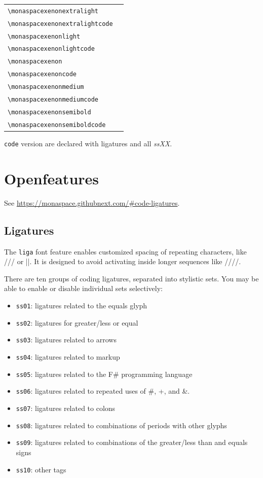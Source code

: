 \documentclass[a4paper]{scrartcl}
\newcommand*{\opt}[1]{\texttt{#1}}
\newcommand*{\cmd}[1]{\texttt{\textbackslash #1}}\newcommand*{\showtchar}[1]{\cmd{#1}~\csname #1\endcsname}
\newcommand\samplettxt{oO08 iIlL1 g9qCGQ <=>}
\newcommand\samplett[1][]{\cmd{#1} & \fbox{\csname#1\endcsname\samplettxt} \\}
\begin{document}
\begin{tabular}{ll}
	\samplett[monaspacexenonextralight]
	\samplett[monaspacexenonextralightcode]
	\samplett[monaspacexenonlight]
	\samplett[monaspacexenonlightcode]
	\samplett[monaspacexenon]
	\samplett[monaspacexenoncode]
	\samplett[monaspacexenonmedium]
	\samplett[monaspacexenonmediumcode]
	\samplett[monaspacexenonsemibold]
	\samplett[monaspacexenonsemiboldcode]
\end{tabular}

\opt{code} version are declared with ligatures and all \textit{ssXX}.

\pagebreak

\section{Openfeatures}

See \url{https://monaspace.githubnext.com/\#code-ligatures}.

\subsection{Ligatures}

The \opt{liga} font feature enables customized spacing of repeating characters, like /// or ||. It is designed to avoid activating inside longer sequences like ////.

There are ten groups of coding ligatures, separated into stylistic sets. You may be able to enable or disable individual sets selectively:

\begin{itemize}
	\item \opt{ss01}: ligatures related to the equals glyph
	\item \opt{ss02}: ligatures for greater/less or equal
	\item \opt{ss03}: ligatures related to arrows
	\item \opt{ss04}: ligatures related to markup
	\item \opt{ss05}: ligatures related to the F\# programming language
	\item \opt{ss06}: ligatures related to repeated uses of \#, +, and \&.
	\item \opt{ss07}: ligatures related to colons
	\item \opt{ss08}: ligatures related to combinations of periods with other glyphs
	\item \opt{ss09}: ligatures related to combinations of the greater/less than and equals signs
	\item \opt{ss10}: other tags
\end{itemize}
\end{document}
